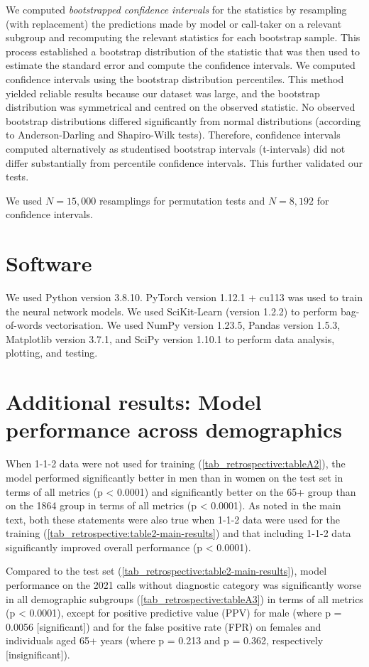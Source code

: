 {We computed \emph{bootstrapped confidence intervals} for the statistics by resampling (with replacement) the predictions made by model or call-taker on a relevant subgroup and recomputing the relevant statistics for each bootstrap sample. This process established a bootstrap distribution of the statistic that was then used to estimate the standard error and compute the confidence intervals. We computed confidence intervals using the bootstrap distribution percentiles. This method yielded reliable results because our dataset was large, and the bootstrap distribution was symmetrical and centred on the observed statistic. No observed bootstrap distributions differed significantly from normal distributions (according to Anderson-Darling and Shapiro-Wilk tests). Therefore, confidence intervals computed alternatively as studentised bootstrap intervals (t-intervals) did not differ substantially from percentile confidence intervals. This further validated our tests.

We used $N=15,000$ resamplings for permutation tests and $N=8,192$ for confidence intervals.


\section{Software}

We used Python version 3.8.10. PyTorch version 1.12.1 + cu113 was used to train the neural network models. We used SciKit-Learn (version 1.2.2) to perform bag-of-words vectorisation. We used NumPy version 1.23.5, Pandas version 1.5.3, Matplotlib version 3.7.1, and SciPy version 1.10.1 to perform data analysis, plotting, and testing.


\section{Additional results: Model performance across demographics}

When 1-1-2 data were not used for training (\cref{tab_retrospective:tableA2}), the model performed significantly better in men than in women on the test set in terms of all metrics (p < 0.0001) and significantly better on the 65+ group than on the 1864 group in terms of all metrics (p < 0.0001). As noted in the main text, both these statements were also true when 1-1-2 data were used for the training (\cref{tab_retrospective:table2-main-results}) and that including 1-1-2 data significantly improved overall performance (p < 0.0001).

Compared to the test set (\cref{tab_retrospective:table2-main-results}), model performance on the 2021 calls without diagnostic category was significantly worse in all demographic subgroups (\cref{tab_retrospective:tableA3}) in terms of all metrics (p < 0.0001), except for positive predictive value (PPV) for male (where p = 0.0056 [significant]) and for the false positive rate (FPR) on females and individuals aged 65+ years (where p = 0.213 and p = 0.362, respectively [insignificant]).

}
